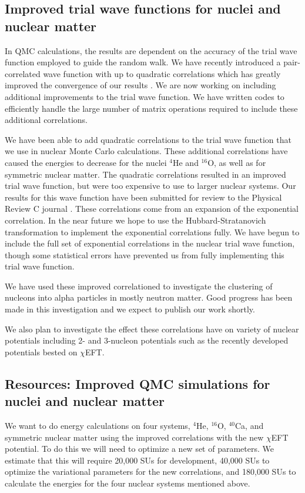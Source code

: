 \documentclass[12pt,letterpaper]{article}
\begin{document}
\subsection{Improved trial wave functions for nuclei and nuclear matter}
In QMC calculations, the results are dependent on the accuracy of the trial wave function employed to guide the random walk. We have recently introduced a pair-correlated wave function with up to quadratic correlations which has greatly improved the convergence of our results \cite{lonardoni2018}. We are now working on including additional improvements to the trial wave function. We have written codes to efficiently handle the large number of matrix operations required to include these additional correlations.

We have been able to add quadratic correlations to the trial wave function that we use in nuclear Monte Carlo calculations. These additional correlations have caused the energies to decrease for the nuclei $^4$He and $^{16}$O, as well as for symmetric nuclear matter. The quadratic correlations resulted in an improved trial wave function, but were too expensive to use to larger nuclear systems. Our results for this wave function have been submitted for review to the Physical Review C journal \cite{lonardoni2018}. These correlations come from an expansion of the exponential correlation. In the near future we hope to use the Hubbard-Stratanovich transformation to implement the exponential correlations fully. We have begun to include the full set of exponential correlations in the nuclear trial wave function, though some statistical errors have prevented us from fully implementing this trial wave function.

We have used these improved correlationed to investigate the clustering of nucleons into alpha particles in mostly neutron matter. Good progress has been made in this investigation and we expect to publish our work shortly.

We also plan to investigate the effect these correlations have on variety of nuclear potentials including 2- and 3-nucleon potentials such as the recently developed potentials bested on $\chi$EFT.

\subsection{Resources: Improved QMC simulations for nuclei and nuclear matter}
We want to do energy calculations on four systems, $^4$He, $^{16}$O, $^{40}$Ca, and symmetric nuclear matter using the improved correlations with the new $\chi$EFT potential. To do this we will need to optimize a new set of parameters. We estimate that this will require 20,000 SUs for development, 40,000 SUs to optimize the variational parameters for the new correlations, and 180,000 SUs to calculate the energies for the four nuclear systems mentioned above.
\end{document}
